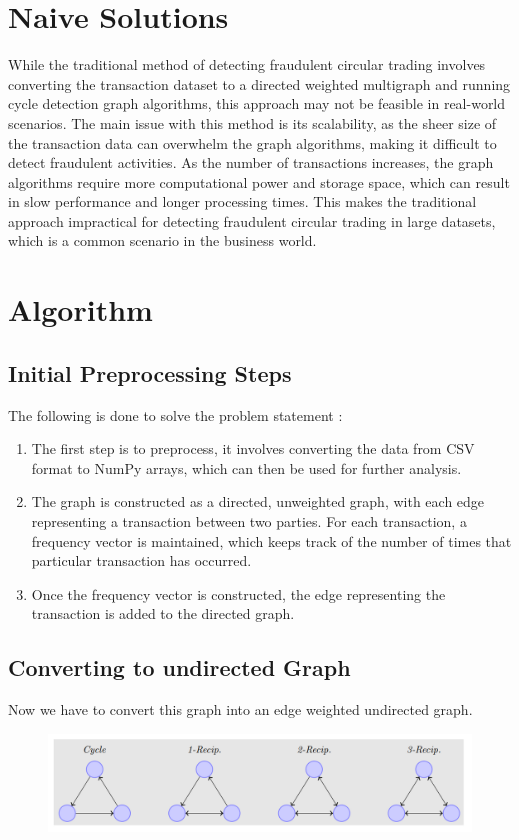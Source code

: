 \documentclass[12pt,a4paper]{article}
\begin{document}
\section{Naive Solutions}
While the traditional method of detecting fraudulent circular trading involves converting the transaction dataset to a directed weighted multigraph and running cycle detection graph algorithms, this approach may not be feasible in real-world scenarios. The main issue with this method is its scalability, as the sheer size of the transaction data can overwhelm the graph algorithms, making it difficult to detect fraudulent activities. 
As the number of transactions increases, the graph algorithms require more computational power and storage space, which can result in slow performance and longer processing times. This makes the traditional approach impractical for detecting fraudulent circular trading in large datasets, which is a common scenario in the business world.

\section{Algorithm}
\subsection{Initial Preprocessing Steps}
The  following is done to solve the problem statement : 
\begin{enumerate}
    \item The first step is to preprocess, it involves converting the data from CSV format to NumPy arrays, which can then be used for further analysis.
    \item The graph is constructed as a directed, unweighted graph, with each edge representing a transaction between two parties. For each transaction, a frequency vector is maintained, which keeps track of the number of times that particular transaction has occurred.
    \item Once the frequency vector is constructed, the edge representing the transaction is added to the directed graph. 
\end{enumerate}

\subsection{Converting to undirected Graph}
Now we have to convert this graph into an edge weighted undirected graph.

\begin{figure}[H]
\centering
\label{fig:3cycle}
\includegraphics[width=12cm]{3-cycle.png}
\end{figure}
\end{document}
